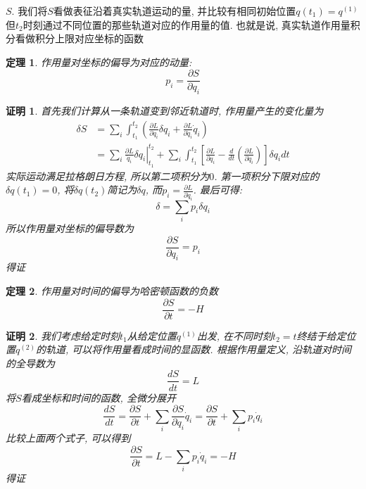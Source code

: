 \documentclass[a4paper,11pt]{article}
\theoremstyle{mystyle}
\newtheorem{theorem}{\hspace{2em}定理}[section]
\newtheorem{Proof}{\hspace{2em}证明}[section]
\begin{document}
$S$. 我们将$S$看做表征沿着真实轨道运动的量, 并比较有相同初始位置$q(t_1)=q^{(1)}$但$t_2$时刻通过不同位置的那些轨道对应的作用量的值. 也就是说, 真实轨道作用量积分看做积分上限对应坐标的函数
\begin{theorem}
  作用量对坐标的偏导为对应的动量:
\begin{equation}\label{Action Axe}
  p_i=\frac{\partial S}{\partial{q_i}}
\end{equation}
\end{theorem}
\begin{Proof}
  首先我们计算从一条轨道变到邻近轨道时, 作用量产生的变化量为
\begin{equation*}
  \begin{split}
     \delta S & =\sum_{i}\int_{t_1}^{t_2}\left(\frac{\partial L}{\partial{q_i}}\delta{q_i}+\frac{\partial L}{\partial{\dot{q}_i}}\dot{q}_i\right) \\
       &=\left.\sum_{i}\frac{\partial L}{\dot{q}_i}\delta q_i\right|^{t_2}_{t_1}+\sum_{i}\int_{t_1}^{t_2}\left[\frac{\partial L}{\partial{q_i}}-\frac{d}{dt}\left(\frac{\partial L}{\partial{\dot{q}_i}}\right)\right]\delta q_idt
  \end{split}
\end{equation*}
实际运动满足拉格朗日方程, 所以第二项积分为$0$. 第一项积分下限对应的$\delta q(t_1)=0$, 将$\delta q(t_2)$简记为$\delta q$, 而$p_i=\frac{\partial L}{\partial\dot{q}_i}$. 最后可得:
\begin{equation*}
  \delta=\sum_{i}p_i\delta q_i
\end{equation*}
所以作用量对坐标的偏导数为
\begin{equation*}
  \frac{\partial S}{\partial{q_i}}=p_i
\end{equation*}
得证
\end{Proof}
\begin{theorem}\label{Action time}
  作用量对时间的偏导为哈密顿函数的负数
\begin{equation*}
  \frac{\partial S}{\partial t}=-H
\end{equation*}
\end{theorem}
\begin{Proof}
  我们考虑给定时刻$t_1$从给定位置$q^{(1)}$出发, 在不同时刻$t_2=t$终结于给定位置$q^{(2)}$的轨道, 可以将作用量看成时间的显函数. 根据作用量定义, 沿轨道对时间的全导数为
\begin{equation*}
  \frac{dS}{dt}=L
\end{equation*}
将$S$看成坐标和时间的函数, 全微分展开
\begin{equation*}
  \frac{dS}{dt}=\frac{\partial S}{\partial t}+\sum_{i}\frac{\partial S}{\partial{q_i}}\dot{q}_i=\frac{\partial S}{\partial t}+\sum_{i}p_i\dot{q}_i
\end{equation*}
比较上面两个式子, 可以得到
\begin{equation*}
  \frac{\partial S}{\partial t}=L-\sum_{i}p_i\dot{q}_i=-H
\end{equation*}
得证
\end{Proof}
\end{document}
